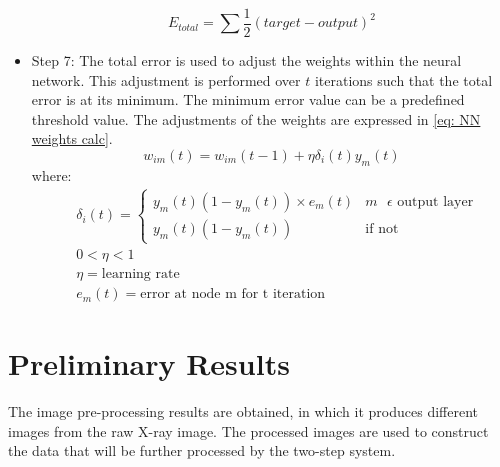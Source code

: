 \documentclass[11pt]{article}
\begin{document}
\begin{itemize}
	\begin{equation}
		\label{eq: NN total error calculation}
		E_{total} = \sum \frac{1}{2} (target - output)^2
	\end{equation}
		\item Step 7: The total error is used to adjust the weights within the neural network. This adjustment is performed over $t$ iterations such that the total error is at its minimum. The minimum error value can be a predefined threshold value. The adjustments of the weights are expressed in \eqref{eq: NN weights calc}.
	\begin{equation}
		\label{eq: NN weights calc}
		w_{im}(t) = w_{im}(t-1)+\eta\delta_i(t)y_m(t)
	\end{equation}
	where:
	\begin{align*}
		& \delta_i(t) = 
		\begin{cases}
			y_m(t)(1 - y_m(t))\times e_m(t) & m \text{ } \epsilon \text{ output layer}\\
			y_m(t)(1 - y_m(t)) & \text{if not}
		\end{cases} \\
		& 0 < \eta < 1 \\
		& \eta = \text{learning rate} \\
		& e_m(t) = \text{error at node m for t iteration}
	\end{align*}
	\end{itemize}

	\section{Preliminary Results}
	\label{sc: Preliminary Results}
	The image pre-processing results are obtained, in which it produces different images from the raw X-ray image. The processed images are used to construct the data that will be further processed by the two-step system. 
\end{document}
